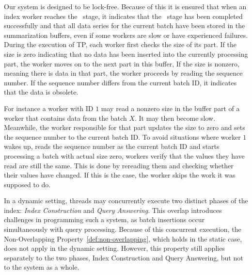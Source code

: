 Our system is designed to be lock-free. Because of this it is ensured that when an index worker
reaches the \TP\ stage, it indicates that the \BC\ stage has been completed successfully and
that all data series for the current batch have been stored in the summarization buffers, even
if some workers are slow or have experienced failures.
% 
During the execution of TP, each worker first checks the size of its part.
If the size is zero indicating that no data has been inserted into the currently processing part,
the worker moves on to the next part in this buffer,
If the size is nonzero, meaning there is data in that part, the worker proceeds by
reading the sequence number. If the sequence number differs from the current batch ID,
it indicates that the data is obsolete.

For instance a worker with ID $1$ may read a nonzero size in the buffer part of a worker
that contains data from the batch $X$. It may then become slow. Meanwhile, the worker 
responsible for that part updates the size to zero and sets the sequence number to
the current batch ID. To avoid situations where worker $1$ wakes up, reads the sequence number
as the current batch ID and starts processing a batch with actual size zero, workers verify that
the values they have read are still the same. This is done by rereading them and checking whether
their values have changed. If this is the case, the worker skips the work it was supposed to do.

% 
In a dynamic setting, threads may concurrently execute two distinct phases of the index:
\textit{Index Construction} and \textit{Query Answering}. This overlap introduces challenges
in programming such a system, as batch insertions occur simultaneously with query processing. 
Because of this concurrent execution, the Non-Overlapping
Property~\ref{def:non-overlapping}, which holds in the static case, does not apply
in the dynamic setting. However, this property still applies separately to the two
phases, Index Construction and Query Answering, but not to the system as a whole.

